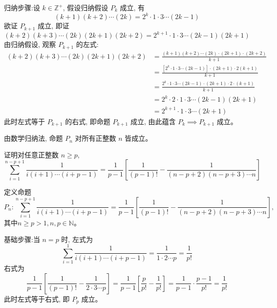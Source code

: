 \begin{questions}
\begin{solution}
        归纳步骤:设 $k \in \mathbb{Z}^{+}$, 假设归纳假设 $P_k$ 成立, 有
        \[
        (k + 1)(k + 2) \cdots (2k) = 2^k \cdot 1 \cdot 3 \cdots (2k - 1)
        \]
        欲证 $P_{k+1}$ 成立, 即证
        \[
        (k + 2)(k + 3) \cdots (2k)(2k + 1)(2k + 2) = 2^{k+1} \cdot 1 \cdot 3 \cdots (2k - 1)(2k + 1)
        \]
        由归纳假设, 观察 $P_{k+1}$ 的左式:
        \begin{align}
        (k + 2)(k + 3) \cdots (2k)(2k + 1)(2k + 2) 
        &= \frac{(k + 1)(k + 2) \cdots (2k) \cdot (2k + 1) \cdot (2k + 2)}{k + 1} \\
        &= \frac{ \left[ 2^k \cdot 1 \cdot 3 \cdots (2k - 1) \right] \cdot (2k + 1) \cdot 2(k + 1)}{k + 1} \\
        &= \frac{2^k \cdot 1 \cdot 3 \cdots (2k - 1) \cdot (2k + 1) \cdot 2 \cdot (k + 1)}{k + 1} \\
        &= 2^{k} \cdot 2 \cdot 1 \cdot 3 \cdots (2k - 1)(2k + 1) \\
        &= 2^{k+1} \cdot 1 \cdot 3 \cdots (2k + 1)
        \end{align}
        此时左式等于 $P_{k+1}$ 的右式, 即命题 $P_{k+1}$ 成立, 由此蕴含 $P_k \implies P_{k+1}$ 成立。

        由数学归纳法, 命题 $P_n$ 对所有正整数 $n$ 皆成立。
    \end{solution}

    \question 证明对任意正整数 $n \ge p$,
    \[
    \sum_{i=1}^{n-p+1} \frac{1}{i(i+1)\cdots(i+p-1)} = \frac{1}{p-1} \left[ \frac{1}{(p-1)!} - \frac{1}{(n-p+2)(n-p+3)\cdots n} \right]
    \]
    \begin{solution}
        定义命题
        \[
        P_n:\sum_{i=1}^{n-p+1} \frac{1}{i(i+1)\cdots(i+p-1)} = \frac{1}{p-1} \left[ \frac{1}{(p-1)!} - \frac{1}{(n-p+2)(n-p+3)\cdots n} \right],
        \]
        其中$n \ge p >1 ,n,p \in \mathbb{N}$。

        基础步骤:当 $n = p$ 时, 左式为
        \[
        \sum_{i=1}^{1} \frac{1}{i(i+1)\cdots(i+p-1)} = \frac{1}{1 \cdot 2 \cdots p} = \frac{1}{p!}
        \]
        右式为
        \[
        \frac{1}{p-1} \left[ \frac{1}{(p-1)!} - \frac{1}{2 \cdot 3 \cdots p} \right] = \frac{1}{p-1} \left[ \frac{p}{p!} - \frac{1}{p!} \right] = \frac{1}{p-1} \cdot \frac{p-1}{p!} = \frac{1}{p!}
        \]
        此时左式等于右式, 即 $P_p$ 成立。


\end{solution}
\end{questions}
